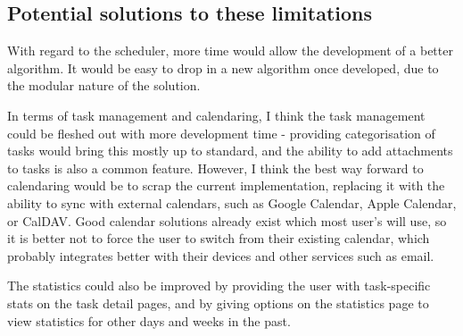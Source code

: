 \documentclass{article}
\begin{document}
\subsection{Potential solutions to these limitations}
With regard to the scheduler,
more time would allow the development of a better algorithm.
It would be easy to drop in a new algorithm once developed,
due to the modular nature of the solution.

In terms of task management and calendaring,
I think the task management could be fleshed out with more development time -
providing categorisation of tasks would bring this mostly up to standard,
and the ability to add attachments to tasks is also a common feature.
However,
I think the best way forward to calendaring would be to scrap the current implementation,
replacing it with the ability to sync with external calendars,
such as Google Calendar,
Apple Calendar,
or CalDAV.
Good calendar solutions already exist which most user's will use,
so it is better not to force the user to switch from their existing calendar,
which probably integrates better with their devices and other services such as email.

The statistics could also be improved by providing the user with task-specific stats on the task detail pages,
and by giving options on the statistics page to view statistics for other days and weeks in the past.
\end{document}
